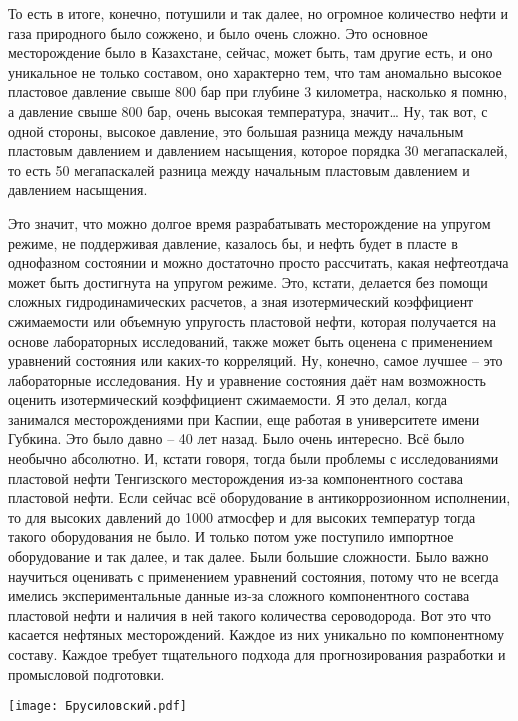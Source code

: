 \documentclass[main.tex]{subfiles}
\begin{document}
То есть в итоге, конечно, потушили и так далее, но огромное количество нефти и газа природного было сожжено, и было очень сложно.
Это основное месторождение было в Казахстане, сейчас, может быть, там другие есть, и оно уникальное не только составом, оно характерно тем, что там аномально высокое пластовое давление свыше 800 бар при глубине 3 километра, насколько я помню, а давление свыше 800 бар, очень высокая температура, значит…
Ну, так вот, с одной стороны, высокое давление, это большая разница между начальным пластовым давлением и давлением насыщения, которое порядка 30 мегапаскалей, то есть 50 мегапаскалей разница между начальным пластовым давлением и давлением насыщения.

Это значит, что можно долгое время разрабатывать месторождение на упругом режиме, не поддерживая давление, казалось бы, и нефть будет в пласте в однофазном состоянии и можно достаточно просто рассчитать, какая нефтеотдача может быть достигнута на упругом режиме.
Это, кстати, делается без помощи сложных гидродинамических расчетов, а зная изотермический коэффициент сжимаемости или объемную упругость пластовой нефти, которая получается на основе лабораторных исследований, также может быть оценена с применением уравнений состояния или каких-то корреляций.
Ну, конечно, самое лучшее -- это лабораторные исследования.
Ну и уравнение состояния даёт нам возможность оценить изотермический коэффициент сжимаемости.
Я это делал, когда занимался месторождениями при Каспии, еще работая в университете имени Губкина.
Это было давно -- 40 лет назад.
Было очень интересно.
Всё было необычно абсолютно.
И, кстати говоря, тогда были проблемы с исследованиями пластовой нефти Тенгизского месторождения из-за компонентного состава пластовой нефти.
Если сейчас всё оборудование в антикоррозионном исполнении, то для высоких давлений до 1000 атмосфер и для высоких температур тогда такого оборудования не было.
И только потом уже поступило импортное оборудование и так далее, и так далее.
Были большие сложности.
Было важно научиться оценивать с применением уравнений состояния, потому что не всегда имелись экспериментальные данные из-за сложного компонентного состава пластовой нефти и наличия в ней такого количества сероводорода.
Вот это что касается нефтяных месторождений.
Каждое из них уникально по компонентному составу.
Каждое требует тщательного подхода для прогнозирования разработки и промысловой подготовки.

\begin{center}
\texttt{[image: Брусиловский.pdf]}
\end{center}
\end{document}
